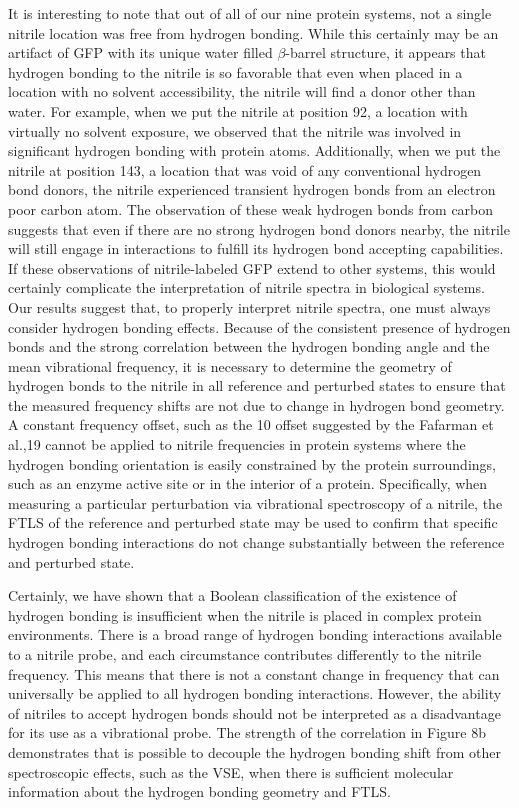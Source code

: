 It is interesting to note that out of all of our nine protein systems, not a single nitrile location was free from hydrogen bonding.
While this certainly may be an artifact of GFP with its unique water filled $\beta$-barrel structure, it appears that hydrogen bonding to the nitrile is so favorable that even when placed in a location with no solvent accessibility, the nitrile will find a donor other than water.
For example, when we put the nitrile at position 92, a location with virtually no solvent exposure, we observed that the nitrile was involved in significant hydrogen bonding with protein atoms.
Additionally, when we put the nitrile at position 143, a location that was void of any conventional hydrogen bond donors, the nitrile experienced transient hydrogen bonds from an electron poor carbon atom.
The observation of these weak hydrogen bonds from carbon suggests that even if there are no strong hydrogen bond donors nearby, the nitrile will still engage in interactions to fulfill its hydrogen bond accepting capabilities.
If these observations of nitrile-labeled GFP extend to other systems, this would certainly complicate the interpretation of nitrile spectra in biological systems.
Our results suggest that, to properly interpret nitrile spectra, one must always consider hydrogen bonding effects.
Because of the consistent presence of hydrogen bonds and the strong correlation between the hydrogen bonding angle and the mean vibrational frequency, it is necessary to determine the geometry of hydrogen bonds to the nitrile in all reference and perturbed states to ensure that the measured frequency shifts are not due to change in hydrogen bond geometry.
A constant frequency offset, such as the 10 \si{\wn} offset suggested by the Fafarman et al.,19 cannot be applied to nitrile frequencies in protein systems where the hydrogen bonding orientation is easily constrained by the protein surroundings, such as an enzyme active site or in the interior of a protein.
Specifically, when measuring a particular perturbation via vibrational spectroscopy of a nitrile, the FTLS of the reference and perturbed state may be used to confirm that specific hydrogen bonding interactions do not change substantially between the reference and perturbed state.

Certainly, we have shown that a Boolean classification of the existence of hydrogen bonding is insufficient when the nitrile is placed in complex protein environments.
There is a broad range of hydrogen bonding interactions available to a nitrile probe, and each circumstance contributes differently to the nitrile frequency.
This means that there is not a constant change in frequency that can universally be applied to all hydrogen bonding interactions.
However, the ability of nitriles to accept hydrogen bonds should not be interpreted as a disadvantage for its use as a vibrational probe.
The strength of the correlation in Figure 8b demonstrates that is possible to decouple the hydrogen bonding shift from other spectroscopic effects, such as the VSE, when there is sufficient molecular information about the hydrogen bonding geometry and FTLS.

